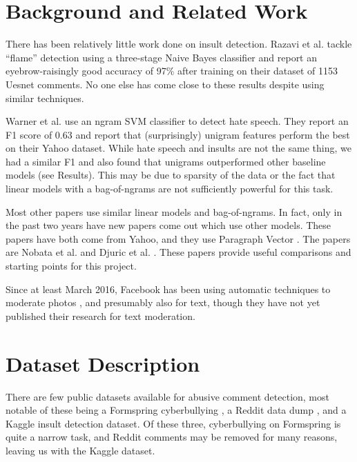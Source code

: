 \documentclass{article} %
\begin{document}
\section*{Background and Related Work}
There has been relatively little work done on insult detection. Razavi et al. \cite{Razavi2010} tackle ``flame'' detection using a three-stage Naive Bayes classifier and report an eyebrow-raisingly good accuracy of 97\% after training on their dataset of 1153 Uesnet comments. No one else has come close to these results despite using similar techniques.

Warner et al. \cite{warner2012detecting} use an ngram SVM classifier to detect hate speech. They report an F1 score of 0.63 and report that (surprisingly) unigram features perform the best on their Yahoo dataset. While hate speech and insults are not the same thing, we had a similar F1 and also found that unigrams outperformed other baseline models (see Results). This may be due to sparsity of the data or the fact that linear models with a bag-of-ngrams are not sufficiently powerful for this task. 

Most other papers \cite{goyal2013peer} \cite{nahar2013effective} \cite{reynolds2011using} \cite{Kontostathis:2013:DCQ:2464464.2464499} \cite{DBLP:conf/www/NobataTTMC16} \cite{chen2012detecting} use similar linear models and bag-of-ngrams. In fact, only in the past two years have new papers come out which use other models. These papers have both come from Yahoo, and they use Paragraph Vector \cite{le2014distributed}. The papers are Nobata et al.\cite{DBLP:conf/www/NobataTTMC16} and Djuric et al. \cite{Djuric:2015:HSD:2740908.2742760}. These papers provide useful comparisons and starting points for this project. 

Since at least March 2016, Facebook has been using automatic techniques to moderate photos \cite{techcrunch-facebook}, and presumably also for text, though they have not yet published their research for text moderation.


\section*{Dataset Description}
There are few public datasets available for abusive comment detection, most notable of these being a Formspring cyberbullying \cite{formspring-data}, a Reddit data dump \cite{reddit-data}, and a Kaggle insult detection \cite{kaggle-data} dataset. Of these three, cyberbullying on Formspring is quite a narrow task, and Reddit comments may be removed for many reasons, leaving us with the Kaggle dataset.  
\end{document}
